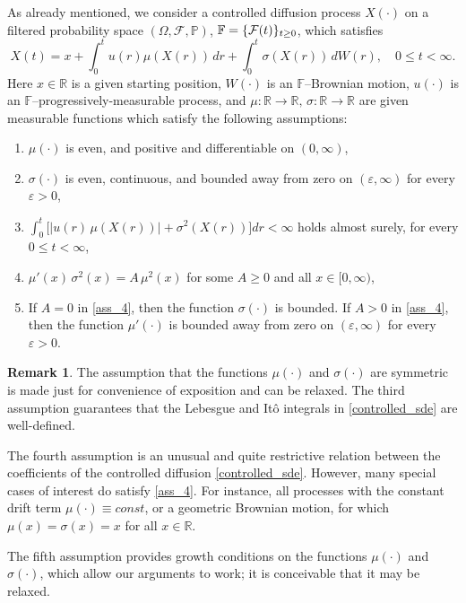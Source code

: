 \documentclass[11pt,tbtags,reqno]{article}
\theoremstyle{definition}
\newtheorem{remark}[Th]{Remark}
\numberwithin{equation}{section}
\theoremstyle{definition}
\newcommand{\pr}{\mathbb{P}}
\newcommand{\eps}{\varepsilon}
\begin{document}
As already mentioned, we consider a controlled diffusion process $X(\cdot)$ on a filtered probability space $(\Omega, \mathcal{F}, \pr)$, $\mathbb{F} =\nobreak \{\mathcal{F}(t)\}_{t \ge 0}$, which satisfies
\begin{equation}\label{controlled_sde}
    X(t) = x + \int_{0}^{t} u(r)\mu(X(r)) \,dr + \int_{0}^{t} \sigma (X(r)) \, dW(r), \quad 0 \le t < \infty.
\end{equation}
Here $x \in \mathbb{R}$ is a given starting position, $W(\cdot)$ is an $\mathbb{F}$--Brownian motion, $u(\cdot)$ is an $\mathbb{F}$--progressively-measurable process, and $\mu: \mathbb{R} \to \mathbb{R}, \, \sigma: \mathbb{R} \to \mathbb{R}$ are given measurable functions which satisfy the following assumptions:
\begin{enumerate}[label = \textbf{(A\arabic*)}]
    \item $\mu(\cdot)$ is even, and positive and differentiable on $(0, \infty)$, \label{ass_1}
    \item $\sigma(\cdot)$ is even, continuous, and bounded away from zero on $(\eps, \infty)$ for every $\eps > 0$, \label{ass_2}
    \item $\int_{0}^{t}\big[|u(r)\, \mu(X(r))|+\sigma^{2}(X(r))\big] d r < \infty$ holds almost surely, for every $0 \leq t < \infty$, \label{ass_3}
    \item $\mu'(x) \, \sigma^2(x) = A \, \mu^2(x)$ for some $A \ge 0$ and all $x \in [0, \infty)$, \label{ass_4}
    \item If $A = 0$ in \ref{ass_4}, then the function $\sigma(\cdot)$ is bounded.
    If $A > 0$ in \ref{ass_4}, then the function $\mu'(\cdot)$ is bounded away from zero on $(\varepsilon, \infty)$ for every $\varepsilon > 0$. \label{unf_assum}
\end{enumerate}
\begin{remark}
    The assumption that the functions $\mu(\cdot)$ and $\sigma(\cdot)$ are symmetric is made just for convenience of exposition and can be relaxed. The third assumption guarantees that the Lebesgue and Itô integrals in \eqref{controlled_sde} are well-defined. 
    
    \vspace{-7pt}
    The fourth assumption is an unusual and quite restrictive relation between the coefficients of the controlled diffusion \eqref{controlled_sde}. However, many special cases of interest do satisfy \ref{ass_4}. For instance, all processes with the constant drift term $\mu(\cdot) \equiv const$, or a geometric Brownian motion, for which $\mu(x) = \sigma(x) = x$ for all $x \in \mathbb{R}$. 

    \vspace{-7pt}
    The fifth assumption provides growth conditions on the functions $\mu(\cdot)$ and $\sigma(\cdot)$, which allow our arguments to work; it is conceivable that it may be relaxed.
\end{remark}
\end{document}
